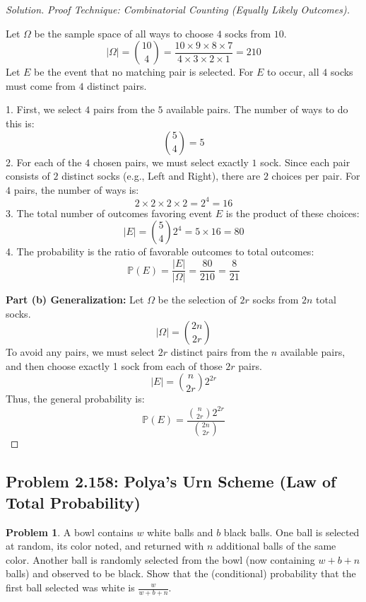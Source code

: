 \documentclass[11pt]{article}
\theoremstyle{definition}
\newtheorem{problem}{Problem}[section]
\theoremstyle{remark}
\newcommand{\Prob}{\mathbb{P}}
\begin{document}
\begin{proof}[Solution]
\textit{Proof Technique: Combinatorial Counting (Equally Likely Outcomes).}

Let $\Omega$ be the sample space of all ways to choose $4$ socks from $10$.
\[ |\Omega| = \binom{10}{4} = \frac{10 \times 9 \times 8 \times 7}{4 \times 3 \times 2 \times 1} = 210 \]
Let $E$ be the event that no matching pair is selected.
For $E$ to occur, all $4$ socks must come from $4$ distinct pairs.

1. First, we select $4$ pairs from the $5$ available pairs. The number of ways to do this is:
   \[ \binom{5}{4} = 5 \]
2. For each of the $4$ chosen pairs, we must select exactly $1$ sock. Since each pair consists of $2$ distinct socks (e.g., Left and Right), there are $2$ choices per pair. For $4$ pairs, the number of ways is:
   \[ 2 \times 2 \times 2 \times 2 = 2^4 = 16 \]
3. The total number of outcomes favoring event $E$ is the product of these choices:
   \[ |E| = \binom{5}{4} 2^4 = 5 \times 16 = 80 \]
4. The probability is the ratio of favorable outcomes to total outcomes:
   \[ \Prob(E) = \frac{|E|}{|\Omega|} = \frac{80}{210} = \frac{8}{21} \]

\textbf{Part (b) Generalization:}
Let $\Omega$ be the selection of $2r$ socks from $2n$ total socks.
\[ |\Omega| = \binom{2n}{2r} \]
To avoid any pairs, we must select $2r$ distinct pairs from the $n$ available pairs, and then choose exactly 1 sock from each of those $2r$ pairs.
\[ |E| = \binom{n}{2r} 2^{2r} \]
Thus, the general probability is:
\[ \Prob(E) = \frac{\binom{n}{2r} 2^{2r}}{\binom{2n}{2r}} \]
\end{proof}

\subsection{Problem 2.158: Polya's Urn Scheme (Law of Total Probability)}
\begin{problem}
A bowl contains $w$ white balls and $b$ black balls. One ball is selected at random, its color noted, and returned with $n$ additional balls of the same color. Another ball is randomly selected from the bowl (now containing $w+b+n$ balls) and observed to be black. Show that the (conditional) probability that the first ball selected was white is $\frac{w}{w+b+n}$.
\end{problem}
\end{document}
